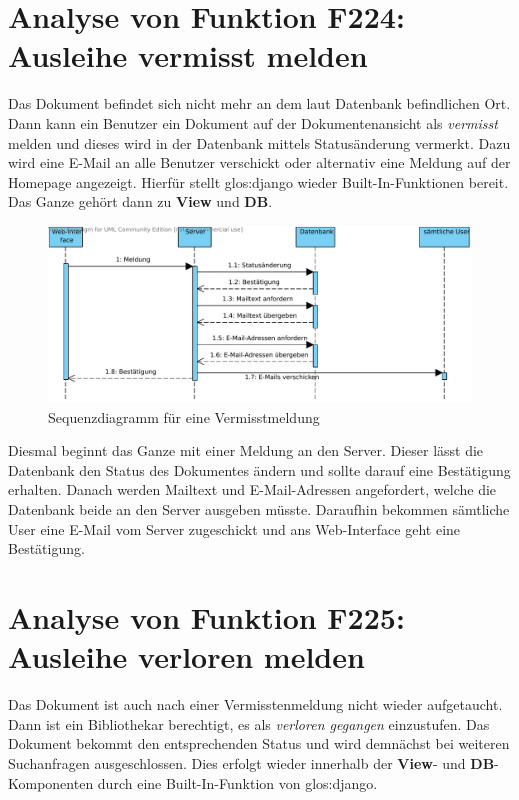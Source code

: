 \section{Analyse von Funktion F224: Ausleihe vermisst melden}
\label{f:224}
Das Dokument befindet sich nicht mehr an dem laut Datenbank befindlichen Ort. 
Dann kann ein Benutzer ein Dokument auf der Dokumentenansicht als 
\emph{vermisst} melden und dieses wird in der Datenbank mittels Statusänderung 
vermerkt. Dazu wird eine E-Mail an alle Benutzer verschickt oder alternativ eine
Meldung auf der Homepage angezeigt. Hierfür stellt \gls{glos:django} wieder 
Built-In-Funktionen bereit. Das Ganze gehört dann zu \textbf{View} und 
\textbf{DB}.

\begin{figure}[H]
\begin{center}
\includegraphics[width=0.8\linewidth]{bilder/Seq-Vermisst.pdf}
\caption{Sequenzdiagramm für eine Vermisstmeldung}
\label{fig:224}
\end{center}
\end{figure}
Diesmal beginnt das Ganze mit einer Meldung an den Server. Dieser lässt die Datenbank den Status des Dokumentes ändern und sollte darauf eine Bestätigung erhalten. Danach werden Mailtext und E-Mail-Adressen angefordert, welche die Datenbank beide an den Server ausgeben müsste. Daraufhin bekommen sämtliche User eine E-Mail vom Server zugeschickt und ans Web-Interface geht eine Bestätigung.

\section{Analyse von Funktion F225: Ausleihe verloren melden}
\label{f:225}
Das Dokument ist auch nach einer Vermisstenmeldung nicht wieder aufgetaucht. 
Dann ist ein Bibliothekar berechtigt, es als \emph{verloren gegangen} 
einzustufen. Das Dokument bekommt den entsprechenden Status und wird demnächst 
bei weiteren Suchanfragen ausgeschlossen. Dies erfolgt wieder innerhalb der 
\textbf{View}- und \textbf{DB}-Komponenten durch eine Built-In-Funktion von 
\gls{glos:django}.

